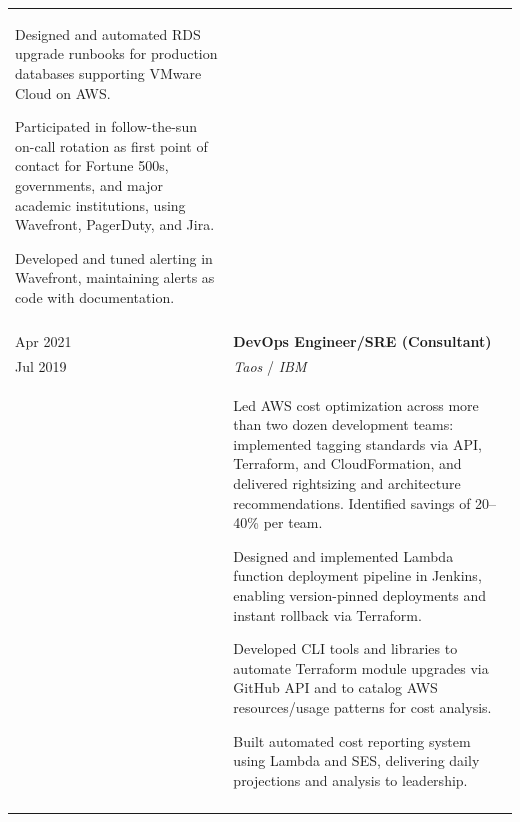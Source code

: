\documentclass[10pt]{article}
\newcommand{\afterlistspace}[0]{\vspace{-1.5em}}
\begin{document}
\begin{tabular}{p{1.5cm}|p{16cm}}
\begin{itemize}
{            \item Designed and automated RDS upgrade runbooks for production databases supporting VMware Cloud on AWS.

            \item Participated in follow-the-sun on-call rotation as first point of contact for Fortune 500s, governments, and major academic institutions, using Wavefront, PagerDuty, and Jira.

            \item Developed and tuned alerting in Wavefront, maintaining alerts as code with documentation.
        }

        \afterlistspace
    \end{itemize}
    
    \\
    \multicolumn{2}{c}{}
    \\

    Apr 2021 & \textbf{DevOps Engineer/SRE (Consultant)}
    \\
    Jul 2019 & \emph{Taos} / \emph{IBM}
    \\
    & \begin{itemize}
        \setlength{\itemsep}{0.25em}
        \footnotesize{
            \item Led AWS cost optimization across more than two dozen development teams: implemented tagging standards via API, Terraform, and CloudFormation, and delivered rightsizing and architecture recommendations. Identified savings of 20--40\% per team.

            \item Designed and implemented Lambda function deployment pipeline in Jenkins, enabling version-pinned deployments and instant rollback via Terraform.
            
            \item Developed CLI tools and libraries to automate Terraform module upgrades via GitHub API and to catalog AWS resources/usage patterns for cost analysis.
            
            \item Built automated cost reporting system using Lambda and SES, delivering daily projections and analysis to leadership.
        }

        \afterlistspace
    \end{itemize}
    
    \\
    \multicolumn{2}{c}{}
    \\


\end{tabular}
\end{document}
